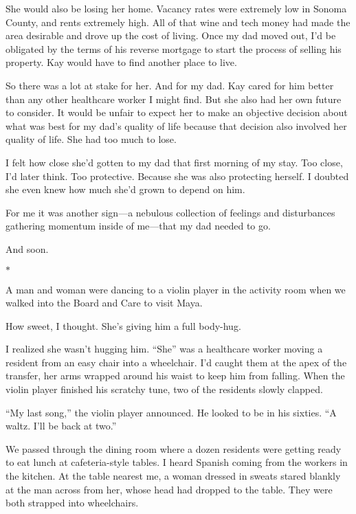 \documentclass[12pt]{book}
\begin{document}
She would also be losing her home. Vacancy rates were extremely low in Sonoma County, and rents extremely high. All of that wine and tech money had made the area desirable and drove up the cost of living. Once my dad moved out, I'd be obligated by the terms of his reverse mortgage to start the process of selling his property. Kay would have to find another place to live.

So there was a lot at stake for her. And for my dad. Kay cared for him better than any other healthcare worker I might find. But she also had her own future to consider. It would be unfair to expect her to make an objective decision about what was best for my dad's quality of life because that decision also involved her quality of life. She had too much to lose.

I felt how close she'd gotten to my dad that first morning of my stay. Too close, I'd later think. Too protective. Because she was also protecting herself. I doubted she even knew how much she'd grown to depend on him.

For me it was another sign---a nebulous collection of feelings and disturbances gathering momentum inside of me---that my dad needed to go.

And soon.

\begin{center}$*$\end{center}

A man and woman were dancing to a violin player in the activity room when we walked into the Board and Care to visit Maya.

How sweet, I thought. She's giving him a full body-hug.

I realized she wasn't hugging him. ``She'' was a healthcare worker moving a resident from an easy chair into a wheelchair. I'd caught them at the apex of the transfer, her arms wrapped around his waist to keep him from falling. When the violin player finished his scratchy tune, two of the residents slowly clapped.

``My last song,'' the violin player announced. He looked to be in his sixties. ``A waltz. I'll be back at two.''

We passed through the dining room where a dozen residents were getting ready to eat lunch at cafeteria-style tables. I heard Spanish coming from the workers in the kitchen. At the table nearest me, a woman dressed in sweats stared blankly at the man across from her, whose head had dropped to the table. They were both strapped into wheelchairs.
\end{document}

